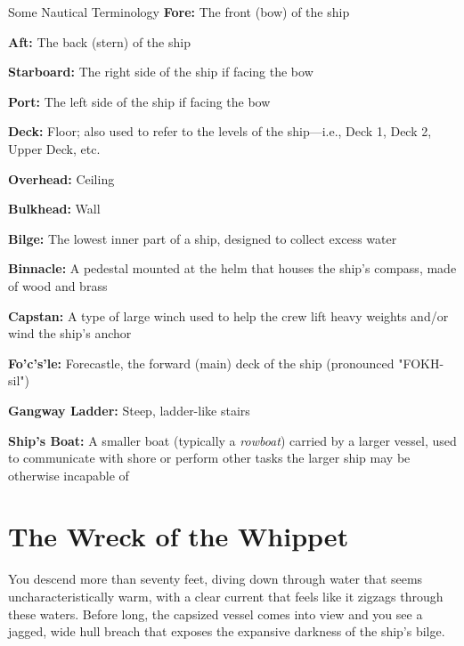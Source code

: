 \documentclass[10pt,a4paper,twoside,bg=print,twocolumn,openany,nodeprecatedcode]{dndbook}
\begin{document}
\begin{DndSidebar}[float=!b]{Some Nautical Terminology}
\textbf{Fore:} The front (bow) of the ship



\textbf{Aft:} The back (stern) of the ship



\textbf{Starboard:} The right side of the ship if facing the bow



\textbf{Port:} The left side of the ship if facing the bow



\textbf{Deck:} Floor; also used to refer to the levels of the ship—i.e., Deck 1, Deck 2, Upper Deck, etc.



\textbf{Overhead:} Ceiling



\textbf{Bulkhead:} Wall



\textbf{Bilge:} The lowest inner part of a ship, designed to collect excess water



\textbf{Binnacle:} A pedestal mounted at the helm that houses the ship's compass, made of wood and brass



\textbf{Capstan:} A type of large winch used to help the crew lift heavy weights and/or wind the ship's anchor



\textbf{Fo'c's'le:} Forecastle, the forward (main) deck of the ship (pronounced "FOKH-sil")



\textbf{Gangway Ladder:} Steep, ladder-like stairs



\textbf{Ship's Boat:} A smaller boat (typically a \textit{rowboat}) carried by a larger vessel, used to communicate with shore or perform other tasks the larger ship may be otherwise incapable of



\end{DndSidebar}

\section{The Wreck of the Whippet}
\begin{DndReadAloud}{}
You descend more than seventy feet, diving down through water that seems uncharacteristically warm, with a clear current that feels like it zigzags through these waters. Before long, the capsized vessel comes into view and you see a jagged, wide hull breach that exposes the expansive darkness of the ship's bilge.

\end{DndReadAloud}
\end{document}
